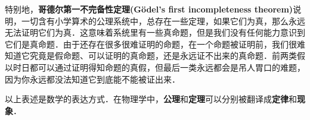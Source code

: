 特别地，\textbf{哥德尔第一不完备性定理(Gödel's first incompleteness theorem)}说明，一切含有小学算术的公理系统中，总存在一些定理，如果它们为真，那么永远无法证明它们为真．这意味着系统里有一些真命题，但是我们没有任何能力意识到它们是真命题．由于还存在很多很难证明的命题，在一个命题被证明前，我们很难知道它究竟是假命题、可以证明的真命题，还是永远证不出来的真命题．前两类假以时日都可以通过证明得知命题的真假，但最后一类永远都会是吊人胃口的难题，因为你永远都没法知道它到底能不能被证出来．

以上表述是数学的表达方式．在物理学中，\textbf{公理}和\textbf{定理}可以分别被翻译成\textbf{定律}和\textbf{现象}． 
